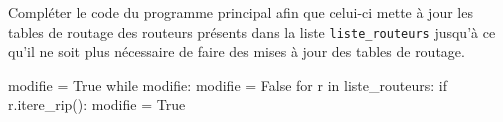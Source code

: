 \begin{enumerate}[series=monDS, resume]
\begin{minipage}{0.44\textwidth}
        \item Compléter le code du programme principal afin que celui-ci mette à jour les tables de routage des routeurs présents dans la liste \verb|liste_routeurs| jusqu’à ce qu’il ne soit plus nécessaire de faire des mises à jour des tables de routage.

\end{minipage}\hfill
\begin{minipage}{0.48\textwidth}


\begin{blocvisible}[height=4.]
    \begin{CodePythontexAlt}[TaillePolice=\large, Largeur=1\linewidth,Centre,Lignes=true,PremLigne=1]{}

modifie = True
while modifie:
    modifie = False
    for r in liste_routeurs:
        if r.itere_rip():
            modifie = True
\end{CodePythontexAlt}
\end{blocvisible}
\end{minipage}
\end{enumerate}